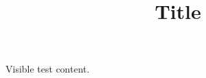 \documentclass[paper=A4]{ropas-poster}
\title{Title}
\begin{document}
Visible test content.
\end{document}
